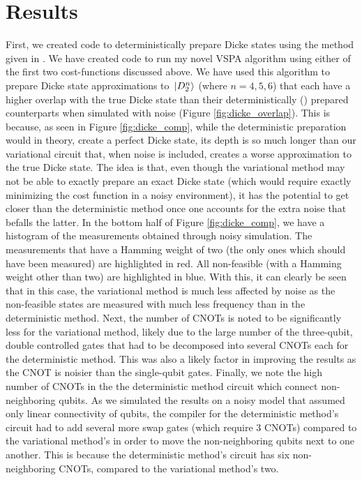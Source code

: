\documentclass[10pt]{article}
\begin{document}
\section{Results}

First, we created code to deterministically prepare Dicke states using the method given in \cite{ref:dicke_prep}. We have created code to run my novel VSPA algorithm using either of the first two cost-functions discussed above. We have used this algorithm to prepare Dicke state approximations to $\ket*{D^n_2}$ (where $n=4,5,6$) that each have a higher overlap with the true Dicke state than their deterministically (\cite{ref:dicke_prep}) prepared counterparts when simulated with noise (Figure \ref{fig:dicke_overlap}). This is because, as seen in Figure \ref{fig:dicke_comp}, while the deterministic preparation would in theory, create a perfect Dicke state, its depth is so much longer than our variational circuit that, when noise is included, creates a worse approximation to the true Dicke state. The idea is that, even though the variational method may not be able to exactly prepare an exact Dicke state (which would require exactly minimizing the cost function in a noisy environment), it has the potential to get closer than the deterministic method once one accounts for the extra noise that befalls the latter. In the bottom half of Figure \ref{fig:dicke_comp}, we have a histogram of the measurements obtained through noisy simulation. The measurements that have a Hamming weight of two (the only ones which should have been measured) are highlighted in red. All non-feasible (with a Hamming weight other than two) are highlighted in blue. With this, it can clearly be seen that in this case, the variational method is much less affected by noise as the non-feasible states are measured with much less frequency than in the deterministic method. Next, the number of CNOTs is noted to be significantly less for the variational method, likely due to the large number of the three-qubit, double controlled gates that had to be decomposed into several CNOTs each for the deterministic method. This was also a likely factor in improving the results as the CNOT is noisier than the single-qubit gates. Finally, we note the high number of CNOTs in the the deterministic method circuit which connect non-neighboring qubits. As we simulated the results on a noisy model that assumed only linear connectivity of qubits, the compiler for the deterministic method's circuit had to add several more swap gates (which require 3 CNOTs) compared to the variational method's in order to move the non-neighboring qubits next to one another. This is because the deterministic method's circuit has six non-neighboring CNOTs, compared to the variational method's two. 
\end{document}
